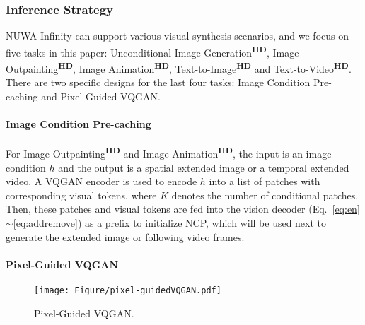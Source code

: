 \documentclass{article}
\begin{document}
\subsubsection{Inference Strategy}\label{sec:is}
\vspace{-3mm}
NUWA-Infinity can support various visual synthesis scenarios, and we focus on five tasks in this paper: Unconditional Image Generation\textsuperscript{\textbf{HD}}, Image Outpainting\textsuperscript{\textbf{HD}}, Image Animation\textsuperscript{\textbf{HD}}, Text-to-Image\textsuperscript{\textbf{HD}} and Text-to-Video\textsuperscript{\textbf{HD}}. There are two specific designs for the last four tasks: Image Condition Pre-caching and Pixel-Guided VQGAN.


\paragraph{Image Condition Pre-caching}
\vspace{-3mm}
For Image Outpainting\textsuperscript{\textbf{HD}} and Image Animation\textsuperscript{\textbf{HD}}, the input is an image condition $h$
and the output is a spatial extended image or a temporal extended video. 
A VQGAN encoder is used to encode $h$ into a list of patches with corresponding visual tokens, where $K$ denotes the number of conditional patches. Then, these patches and visual tokens are fed into the vision decoder (Eq.~\ref{eq:en}$\sim$\ref{eq:addremove}) as a prefix to initialize NCP, which will be used next to generate the extended image or following video frames.


\paragraph{Pixel-Guided VQGAN}
\vspace{-3mm}
\begin{wrapfigure}{r}{0.4\textwidth}
\vspace{-7mm}\texttt{[image: Figure/pixel-guidedVQGAN.pdf]}
    \caption{Pixel-Guided VQGAN.}
    \label{fig:pgvqgan}
\end{wrapfigure}
\end{document}
